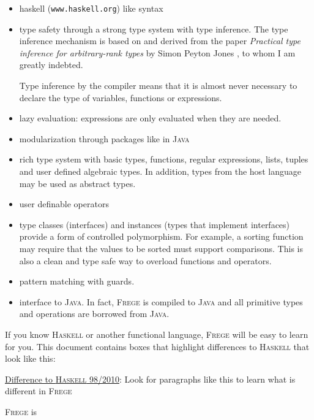 \documentclass[lletterpaper,12pt]{report}
\newcommand{\boxquote}[3]{
\begin{center}
\colorbox{#1}%
{\parbox{0.9\textwidth}{
\sf
\underline{#2}:
#3
}}
\end{center}}
\newcommand{\hasdiff}[1]{\boxquote{rot}{Difference to \haskell{} 98/2010}{#1}}
\newcommand{\haskell}[0]{\textsc{Haskell}}
\newcommand{\frege}[0]{\textsc{Frege}}
\newcommand{\java}[0]{\textsc{Java}}
\begin{document}
\begin{itemize}

\item haskell{} ({\tt www.haskell.org}) like syntax

\item type safety through a strong type system with type inference. The
type inference mechanism is based on and derived from the paper
\emph{Practical type inference for arbitrary-rank types} by Simon
Peyton Jones \cite{ptifart}, to whom I am greatly indebted.

Type inference by the compiler means that it is
almost never necessary to declare the type of variables, functions or
expressions.

\item lazy evaluation: expressions are only evaluated when they are
needed.

\item modularization through packages like in \java{}

\item rich type system with basic types, functions, regular expressions,
lists, tuples and user defined algebraic types.
In addition, types from the host language may be used as abstract
types.

\item user definable operators

\item type classes (interfaces) and instances (types that
implement interfaces) provide a form of controlled polymorphism. For
example, a sorting function may require that the values to be sorted
must support comparisons. This is also a clean and type safe way to
overload functions and operators.

\item pattern matching with guards.

\item interface to \java{}. In fact, \frege{} is
compiled to \java{} and
all primitive types and operations are borrowed from \java{}.


\end{itemize}

If you know \haskell{} or another functional language,
\frege{} will be easy to learn for you. This document contains boxes
that highlight differences to \haskell{} that look like this:

\hasdiff{Look for paragraphs like this to learn what is different in
\frege{}}

\frege{} is
\end{document}
